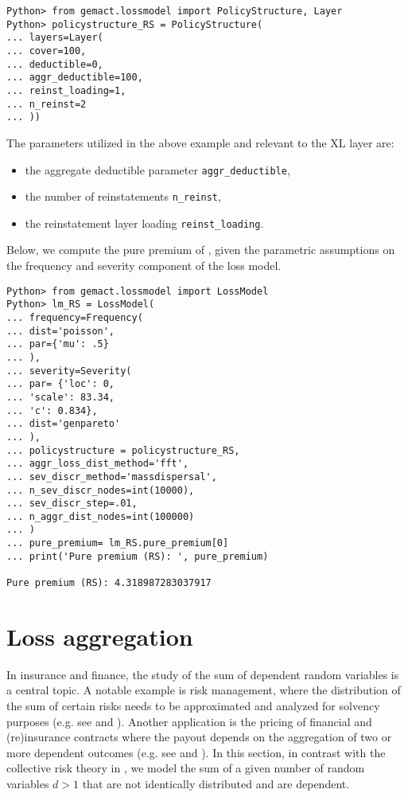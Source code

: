 \documentclass{article}
\begin{document}
\begin{lstlisting}
Python> from gemact.lossmodel import PolicyStructure, Layer
Python> policystructure_RS = PolicyStructure(
... layers=Layer(
... cover=100,
... deductible=0,
... aggr_deductible=100,
... reinst_loading=1,
... n_reinst=2
... ))
\end{lstlisting}

The parameters utilized in the above example and relevant to the XL layer are:

\begin{itemize}
    \item the aggregate deductible parameter \texttt{aggr\_deductible},
    \item the number of reinstatements \texttt{n\_reinst},
    \item  the reinstatement layer loading \texttt{reinst\_loading}.
    
\end{itemize}

Below, we compute the pure premium of , given the parametric assumptions on the frequency and severity component of the loss model.

\begin{lstlisting}
Python> from gemact.lossmodel import LossModel
Python> lm_RS = LossModel(
... frequency=Frequency(
... dist='poisson',
... par={'mu': .5}
... ),
... severity=Severity(
... par= {'loc': 0,
... 'scale': 83.34,
... 'c': 0.834},
... dist='genpareto'
... ),
... policystructure = policystructure_RS,
... aggr_loss_dist_method='fft',
... sev_discr_method='massdispersal',
... n_sev_discr_nodes=int(10000),
... sev_discr_step=.01,
... n_aggr_dist_nodes=int(100000)
... )
... pure_premium= lm_RS.pure_premium[0]
... print('Pure premium (RS): ', pure_premium)

Pure premium (RS): 4.318987283037917
\end{lstlisting}

\section{Loss aggregation}
\label{sec:lossaggregation}

In insurance and finance, the study of the sum of dependent random variables is a central topic. A notable example is risk management, where the distribution of the sum of certain risks needs to be approximated and analyzed for solvency purposes (e.g. see \cite{Wilhelmy2010} and \cite[p.~471]{hull11}).
Another application is the pricing of financial and (re)insurance contracts where the payout depends on the aggregation of two or more dependent outcomes (e.g. see \cite{Cummins1999} and \cite{Wang2013}). In this section, in contrast with the collective risk theory in , we model the sum of a given number of random variables $d > 1$ that are not identically distributed and are dependent.
\newline
\end{document}
